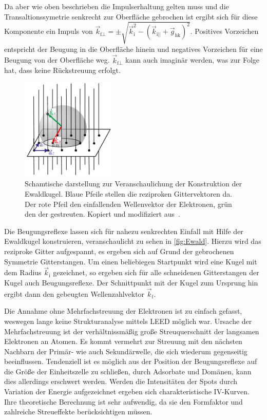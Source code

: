         Da aber wie oben beschrieben die Impulserhaltung gelten muss und die Transaltionssymetrie senkrecht zur Oberfläche gebrochen ist ergibt sich für diese Komponente ein Impuls von $\vec{k}_{\text{f}\perp} = \pm \sqrt{\vec{k}_\text{i}^2 - (\vec{k}_{\text{i}||} + \vec{g}_\text{hk})^2}$.
        Positives Vorzeichen entspricht der Beugung in die Oberfläche hinein und negatives Vorzeichen für eine Beugung von der Oberfläche weg.
        $\vec{k}_{\text{f}\perp}$ kann auch imaginär werden, was zur Folge hat, dass keine Rückstreuung erfolgt.
        \begin{figure}
            \centering
            \includegraphics[width=0.4\textwidth]{Ewald}
            \caption{Schamtische darstellung zur Veranschaulichung der Konstruktion der Ewaldkugel.
            Blaue Pfeile stellen die reziproken Gittervektoren da. 
            Der rote Pfeil den einfallenden Wellenvektor der Elektronen, grün den der gestreuten.
            Kopiert und modifiziert aus~\cite{Fauster}.}
            \label{fig:Ewald}
        \end{figure}
        Die Beugungsreflexe lassen sich für nahezu senkrechten Einfall mit Hilfe der Ewaldkugel konstruieren, veranschaulicht zu sehen in \autoref{fig:Ewald}.
        Hierzu wird das reziproke Gitter aufgespannt, es ergeben sich auf Grund der gebrochenen Symmetrie Gitterstangen.
        Um einen beliebiegen Startpunkt wird eine Kugel mit dem Radius $\vec{k}_\text{i}$ gezeichnet, so ergeben sich für alle schneidenen Gitterstangen der Kugel auch Beugungsreflexe.
        Der Schnittpunkt mit der Kugel zum Ursprung hin ergibt dann den gebeugten Wellenzahlvektor $\vec{k}_\text{f}$.

        Die Annahme ohne Mehrfachstreuung der Elektronen ist zu einfach gefasst, weswegen lange keine Strukturanalyse mittels LEED möglich war.
        Ursache der Mehrfachstreuung ist der verhältnissmäßig große Streuquerschnitt der langsamen Elektronen an Atomen.
        Es kommt vermehrt zur Streuung mit den nächsten Nachbarn der Primär- wie auch Sekundärwelle, die sich wiederum gegenseitig beeinflussen.
        Tendenziell ist es möglich aus der Position der Beugungsreflexe auf die Größe der Einheitszelle zu schließen, durch Adsorbate und Domänen, kann dies allerdings erschwert werden.
        Werden die Intensitäten der Spots durch Variation der Energie aufgezeichnet ergeben sich charakteristische IV-Kurven.
        Ihre theoretische Berechnung ist sehr aufwendig, da sie den Formfaktor und zahlreiche Streueffekte berücksichtigen müssen.

